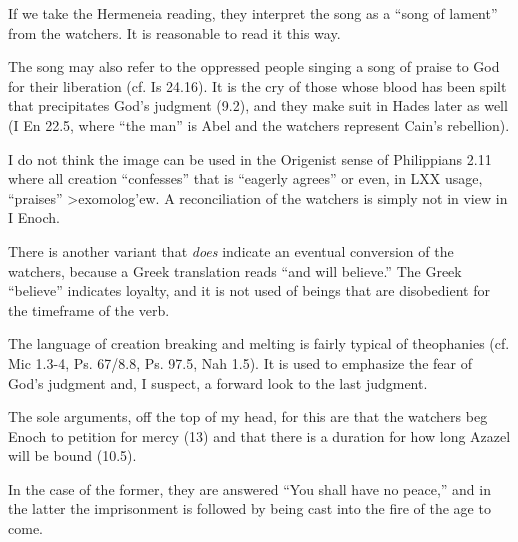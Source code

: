 \documentclass{beamer}
\begin{document}
\begin{frame}
  If we take the Hermeneia reading, they interpret the song as a ``song of lament'' from the watchers.
  It is reasonable to read it this way.
\end{frame}

\begin{frame}
  The song may also refer to the oppressed people singing a song of praise to God for their liberation (cf. Is 24.16).
  It is the cry of those whose blood has been spilt that precipitates God's judgment (9.2), and they make suit in Hades later as well (I En 22.5, where ``the man'' is Abel and the watchers represent Cain's rebellion).
\end{frame}

\begin{frame}
  I do not think the image can be used in the Origenist sense of Philippians 2.11 where all creation ``confesses'' that is ``eagerly agrees'' or even, in LXX usage, ``praises'' \textgreek{>exomolog'ew}.
  A reconciliation of the watchers is simply not in view in I Enoch.
\end{frame}

\begin{frame}
  There is another variant that \emph{does} indicate an eventual conversion of the watchers, because a Greek translation reads ``and will believe.''
  The Greek ``believe'' indicates loyalty, and it is not used of beings that are disobedient for the timeframe of the verb.
\end{frame}

\begin{frame}
  The language of creation breaking and melting is fairly typical of theophanies (cf. Mic 1.3-4, Ps. 67/8.8, Ps. 97.5, Nah 1.5).
  It is used to emphasize the fear of God's judgment and, I suspect, a forward look to the last judgment.
\end{frame}

\begin{frame}
  The sole arguments, off the top of my head, for this are that the watchers beg Enoch to petition for mercy (13) and that there is a duration for how long Azazel will be bound (10.5).
\end{frame}

\begin{frame}
  In the case of the former, they are answered ``You shall have no peace,'' and in the latter the imprisonment is followed by being cast into the fire of the age to come.
\end{frame}
\end{document}
